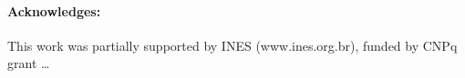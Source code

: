\documentclass[11pt]{article} %
\begin{document}
 
  
\paragraph{Acknowledges:}
This work was partially supported by INES (www.ines.org.br), funded by CNPq
grant \ldots



% 
\end{document}

